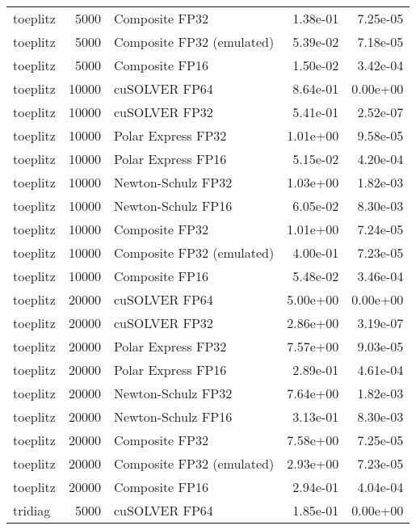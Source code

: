 \begin{table}
\begin{tabular}{lrlrr}
 toeplitz &  5000 &            Composite FP32 &  1.38e-01 &        7.25e-05 \\
 toeplitz &  5000 & Composite FP32 (emulated) &  5.39e-02 &        7.18e-05 \\
 toeplitz &  5000 &            Composite FP16 &  1.50e-02 &        3.42e-04 \\
 toeplitz & 10000 &             cuSOLVER FP64 &  8.64e-01 &        0.00e+00 \\
 toeplitz & 10000 &             cuSOLVER FP32 &  5.41e-01 &        2.52e-07 \\
 toeplitz & 10000 &        Polar Express FP32 &  1.01e+00 &        9.58e-05 \\
 toeplitz & 10000 &        Polar Express FP16 &  5.15e-02 &        4.20e-04 \\
 toeplitz & 10000 &        Newton-Schulz FP32 &  1.03e+00 &        1.82e-03 \\
 toeplitz & 10000 &        Newton-Schulz FP16 &  6.05e-02 &        8.30e-03 \\
 toeplitz & 10000 &            Composite FP32 &  1.01e+00 &        7.24e-05 \\
 toeplitz & 10000 & Composite FP32 (emulated) &  4.00e-01 &        7.23e-05 \\
 toeplitz & 10000 &            Composite FP16 &  5.48e-02 &        3.46e-04 \\
 toeplitz & 20000 &             cuSOLVER FP64 &  5.00e+00 &        0.00e+00 \\
 toeplitz & 20000 &             cuSOLVER FP32 &  2.86e+00 &        3.19e-07 \\
 toeplitz & 20000 &        Polar Express FP32 &  7.57e+00 &        9.03e-05 \\
 toeplitz & 20000 &        Polar Express FP16 &  2.89e-01 &        4.61e-04 \\
 toeplitz & 20000 &        Newton-Schulz FP32 &  7.64e+00 &        1.82e-03 \\
 toeplitz & 20000 &        Newton-Schulz FP16 &  3.13e-01 &        8.30e-03 \\
 toeplitz & 20000 &            Composite FP32 &  7.58e+00 &        7.25e-05 \\
 toeplitz & 20000 & Composite FP32 (emulated) &  2.93e+00 &        7.23e-05 \\
 toeplitz & 20000 &            Composite FP16 &  2.94e-01 &        4.04e-04 \\
  tridiag &  5000 &             cuSOLVER FP64 &  1.85e-01 &        0.00e+00 \\

\end{tabular}
\end{table}
